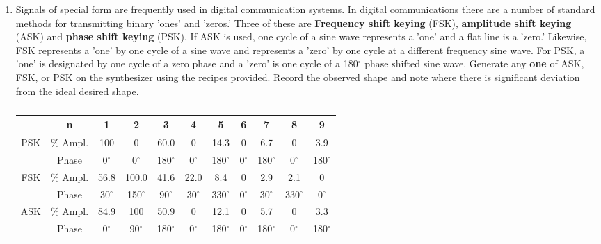 \begin{enumerate}
\begin{marginfigure}[+0in]
\caption*{Amplitude Shift Keying}
\label{fig:fs13}
\end{marginfigure}




\item Signals of special form are frequently used in digital communication systems. In digital communications there are a number of standard methods for transmitting binary 'ones' and 'zeros.'  Three of these are {\bf Frequency shift keying} (FSK), {\bf amplitude shift keying} (ASK) and {\bf phase shift keying} (PSK). If ASK is used, one cycle of a sine wave represents a 'one' and a flat line is a 'zero.'  Likewise, FSK represents a 'one' by one cycle of a sine wave and represents a 'zero' by one cycle at a different frequency sine wave. For PSK, a 'one' is designated by one cycle of a zero phase and a 'zero' is one cycle of a 180$^{\circ}$ phase shifted sine wave. Generate any {\bf one} of ASK, FSK, or PSK on the synthesizer using the recipes provided. Record the observed shape and note where there is significant deviation from the ideal desired shape.

\begin{table}
\footnotesize
\begin{tabular}{c|c|c|c|c|c|c|c|c|c|c|}
\cline{2-11}
&n&1&2&3&4&5&6&7&8&9\\ \hline
\multicolumn{1}{|c|}{\multirow{2}{*}{PSK}}&\% Ampl.&100&0&60.0&0&14.3&0&6.7&0&3.9\\
\multicolumn{1}{|c|}{}&Phase&0$^{\circ}$&0$^{\circ}$&180$^{\circ}$&0$^{\circ}$&180$^{\circ}$&0$^{\circ}$&180$^{\circ}$&0$^{\circ}$&180$^{\circ}$\\ \hline
\multicolumn{1}{|c|}{\multirow{2}{*}{FSK}}&\% Ampl.&56.8&100.0&41.6&22.0&8.4&0&2.9&2.1&0\\
\multicolumn{1}{|c|}{}&Phase&30$^{\circ}$&150$^{\circ}$&90$^{\circ}$&30$^{\circ}$&330$^{\circ}$&0$^{\circ}$&30$^{\circ}$&330$^{\circ}$&0$^{\circ}$\\ \hline
\multicolumn{1}{|c|}{\multirow{2}{*}{ASK}}&\% Ampl.&84.9&100&50.9&0&12.1&0&5.7&0&3.3\\
\multicolumn{1}{|c|}{}&Phase&0$^{\circ}$&90$^{\circ}$&180$^{\circ}$&0$^{\circ}$&180$^{\circ}$&0$^{\circ}$&180$^{\circ}$&0$^{\circ}$&180$^{\circ}$\\ \hline
\end{tabular}
\normalsize
\caption{ }
\label{tab:fs4}
\end{table}


\end{enumerate}

